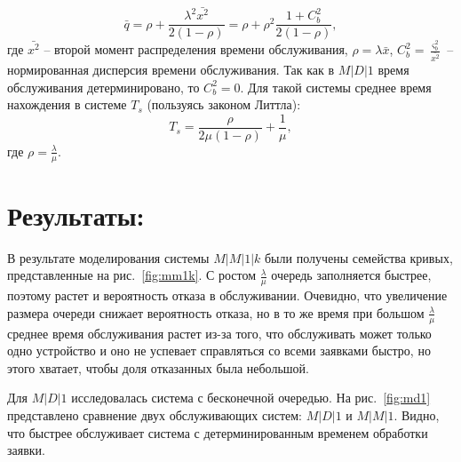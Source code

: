 \documentclass[a4paper,12 pt]{article}
\begin{document}
\begin{equation}
	\bar{q} = \rho + \frac{\lambda^2 \bar{x^2}}{2 (1-\rho)} = \rho + \rho^2\frac{1 + C^2_b}{2 (1-\rho)},
\end{equation}
где $\bar{x^2}$ -- второй момент распределения времени обслуживания, $\rho = \lambda \bar{x}$, $C^2_b = \frac{\varsigma^2_b}{\bar{x^2}}$ -- нормированная дисперсия времени обслуживания. Так как в $M|D|1$ время обслуживания детерминировано, то $C^2_b = 0$.
Для такой системы среднее время нахождения в системе $T_s$ (пользуясь законом Литтла):
\begin{equation}
	T_s = \dfrac{\rho}{2\mu(1-\rho)} + \frac{1}{\mu},
\end{equation}
где $\rho = \frac{\lambda}{\mu}$. 

\section*{Результаты:}
В результате моделирования системы $M|M|1|k$ были получены семейства кривых, представленные на рис.~\ref{fig:mm1k}. С ростом $\frac{\lambda}{\mu}$ очередь заполняется быстрее, поэтому растет и вероятность отказа в обслуживании. Очевидно, что увеличение размера очереди снижает вероятность отказа, но в то же время при большом $\frac{\lambda}{\mu}$ среднее время обслуживания растет из-за того, что обслуживать может только одно устройство и оно не успевает справляться со всеми заявками быстро, но этого хватает, чтобы доля отказанных была небольшой.

Для $M|D|1$ исследовалась система с бесконечной очередью. На рис.~\ref{fig:md1} представлено сравнение двух обслуживающих систем: $M|D|1$ и $M|M|1$. Видно, что быстрее обслуживает система с детерминированным временем обработки заявки. 
\end{document}

